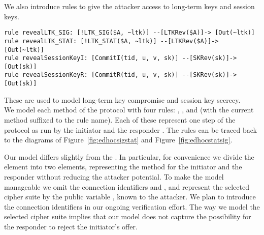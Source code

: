 We also introduce rules to give the attacker access to
long-term keys and session keys.
%
\begin{lstlisting}
rule revealLTK_SIG: [!LTK_SIG($A, ~ltk)] --[LTKRev($A)]-> [Out(~ltk)]
rule revealLTK_STAT: [!LTK_STAT($A, ~ltk)] --[LTKRev($A)]-> [Out(~ltk)]
rule revealSessionKeyI: [CommitI(tid, u, v, sk)] --[SKRev(sk)]-> [Out(sk)]
rule revealSessionKeyR: [CommitR(tid, u, v, sk)] --[SKRev(sk)]-> [Out(sk)]
\end{lstlisting}
%
These are used to model long-term key compromise and session key secrecy.
\\

We model each method of the protocol with four rules: , , 
and  (with the current method suffixed to the rule name).
%
Each of these represent one step of the protocol as run by the initiator 
and the responder .
%
The rules can be traced back to the diagrams of
Figure~\ref{fig:edhocsigstat} and Figure~\ref{fig:edhocstatsig}.
%

Our model differs slightly from the \mSpec{}.
%
In particular, for convenience we divide the \mMethod{} element into two
elements, representing the method for the initiator and the responder without
reducing the attacker potential.
%
To make the model manageable we omit the connection identifiers \mCi{} and
\mCr{}, and represent the selected cipher suite by the public variable
, known to the attacker.
%
We plan to introduce the connection identifiers in our ongoing verification
effort.
%
The way we model the selected cipher suite implies that our model does not
capture the possibility for the responder to reject the initiator's offer. 
%

